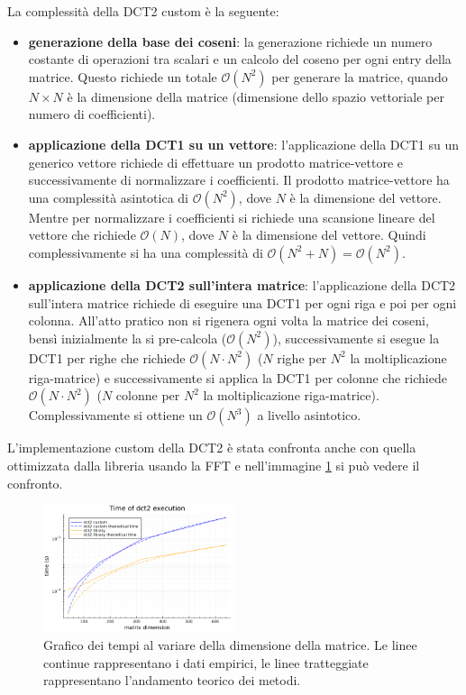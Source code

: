 La complessità della DCT2 custom è la seguente:
\begin{itemize}
    \item \textbf{generazione della base dei coseni}: la generazione richiede
          un numero costante di operazioni tra scalari e un calcolo del coseno per ogni
          entry della matrice. Questo richiede un totale $\mathcal{O}(N^2)$ per generare
          la matrice, quando $N\times N$ è la dimensione della matrice (dimensione dello
          spazio vettoriale per numero di coefficienti).
    \item \textbf{applicazione della DCT1 su un vettore}: l'applicazione della DCT1
          su un generico vettore richiede di effettuare un prodotto matrice-vettore e
          successivamente di normalizzare i coefficienti. Il prodotto matrice-vettore
          ha una complessità asintotica di $\mathcal{O}(N^2)$, dove $N$ è la dimensione
          del vettore. Mentre per normalizzare i coefficienti si richiede una scansione
          lineare del vettore che richiede $\mathcal{O}(N)$, dove $N$ è la dimensione
          del vettore. Quindi complessivamente si ha una complessità di $\mathcal{O}(N^2 + N) = \mathcal{O}(N^2)$.
    \item \textbf{applicazione della DCT2 sull'intera matrice}: l'applicazione della DCT2
          sull'intera matrice richiede di eseguire una DCT1 per ogni riga e poi per ogni
          colonna. All'atto pratico non si rigenera ogni volta la matrice dei coseni,
          bensì inizialmente la si pre-calcola ($\mathcal{O}(N^2)$), successivamente si
          esegue la DCT1 per righe che richiede $\mathcal{O}(N \cdot N^2)$ ($N$ righe
          per $N^2$ la moltiplicazione riga-matrice) e successivamente si applica la
          DCT1 per colonne che richiede $\mathcal{O}(N \cdot N^2)$ ($N$ colonne
          per $N^2$ la moltiplicazione riga-matrice). Complessivamente si ottiene
          un $\mathcal{O}(N^3)$ a livello asintotico.
\end{itemize}

L'implementazione custom della DCT2 è stata confronta anche con quella ottimizzata
dalla libreria usando la FFT e nell'immagine \ref{fig:analisi_complex} si
può vedere il confronto.

\begin{figure}[!h]
    \centering
    \includegraphics[width=0.5\textwidth]{Progetto_2/img/times_plot.png}
    \caption{Grafico dei tempi al variare della dimensione della matrice. Le linee
        continue rappresentano i dati empirici, le linee tratteggiate rappresentano
        l'andamento teorico dei metodi.}
    \label{fig:analisi_complex}
\end{figure}

